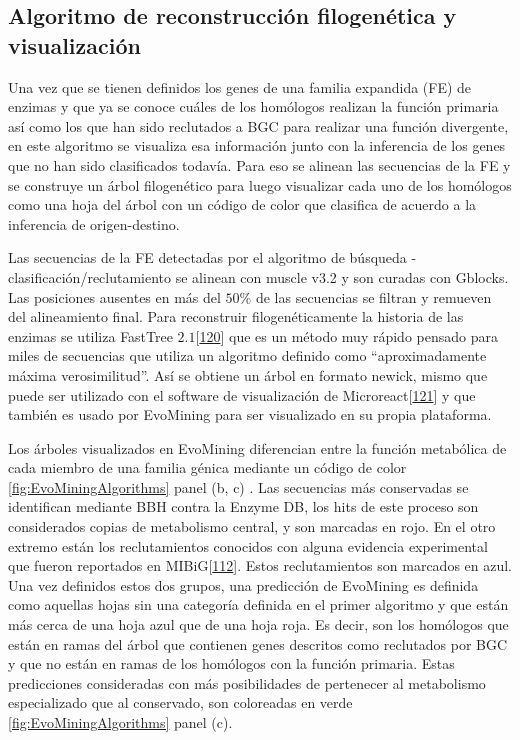 \documentclass[12pt,twoside]{reedthesis}
\begin{document}
  \subsection{Algoritmo de reconstrucción filogenética y
  visualización}\label{algoritmo-de-reconstruccion-filogenetica-y-visualizacion-1}
  
  Una vez que se tienen definidos los genes de una familia expandida (FE)
  de enzimas y que ya se conoce cuáles de los homólogos realizan la
  función primaria así como los que han sido reclutados a BGC para
  realizar una función divergente, en este algoritmo se visualiza esa
  información junto con la inferencia de los genes que no han sido
  clasificados todavía. Para eso se alinean las secuencias de la FE y se
  construye un árbol filogenético para luego visualizar cada uno de los
  homólogos como una hoja del árbol con un código de color que clasifica
  de acuerdo a la inferencia de origen-destino.
  
  Las secuencias de la FE detectadas por el algoritmo de búsqueda -
  clasificación/reclutamiento se alinean con muscle v3.2 y son curadas con
  Gblocks. Las posiciones ausentes en más del \(50\%\) de las secuencias
  se filtran y remueven del alineamiento final. Para reconstruir
  filogenéticamente la historia de las enzimas se utiliza FastTree
  \(2.1\){[}\protect\hyperlink{ref-price_fasttree_2010}{120}{]} que es un
  método muy rápido pensado para miles de secuencias que utiliza un
  algoritmo definido como ``aproximadamente máxima verosimilitud''. Así se
  obtiene un árbol en formato newick, mismo que puede ser utilizado con el
  software de visualización de
  Microreact{[}\protect\hyperlink{ref-argimon_microreact_2016}{121}{]} y
  que también es usado por EvoMining para ser visualizado en su propia
  plataforma.
  
  Los árboles visualizados en EvoMining diferencian entre la función
  metabólica de cada miembro de una familia génica mediante un código de
  color \autoref{fig:EvoMiningAlgorithms} panel (b, c) . Las secuencias
  más conservadas se identifican mediante BBH contra la Enzyme DB, los
  hits de este proceso son considerados copias de metabolismo central, y
  son marcadas en rojo. En el otro extremo están los reclutamientos
  conocidos con alguna evidencia experimental que fueron reportados en
  MIBiG{[}\protect\hyperlink{ref-medema_minimum_2015}{112}{]}. Estos
  reclutamientos son marcados en azul. Una vez definidos estos dos grupos,
  una predicción de EvoMining es definida como aquellas hojas sin una
  categoría definida en el primer algoritmo y que están más cerca de una
  hoja azul que de una hoja roja. Es decir, son los homólogos que están en
  ramas del árbol que contienen genes descritos como reclutados por BGC y
  que no están en ramas de los homólogos con la función primaria. Estas
  predicciones consideradas con más posibilidades de pertenecer al
  metabolismo especializado que al conservado, son coloreadas en verde
  \autoref{fig:EvoMiningAlgorithms} panel (c).
  
\end{document}
